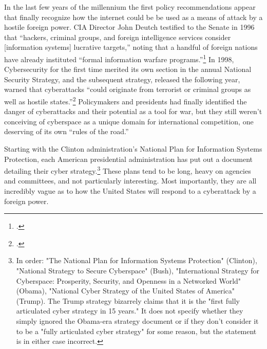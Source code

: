 \documentclass{report}
\begin{document}
\begin{refsegment}
In the last few years of the millennium the first policy recommendations appear that finally recognize how the internet could be be used as a means of attack by a hostile foreign power. CIA Director John Deutch testified to the Senate in 1996 that ``hackers, criminal groups, and foreign intelligence services consider [information systems] lucrative targets,'' noting that a handful of foreign nations have already instituted ``formal information warfare programs.''\footcite{deutch_worldwide_1996} In 1998, Cybersecurity for the first time merited its own section in the annual National Security Strategy, and the subsequent strategy, released the following year, warned that cyberattacks ``could originate from terrorist or criminal groups as well as hostile states.''\footcite[~p.760-761]{boys_clinton_2018} Policymakers and presidents had finally identified the danger of cyberattacks and their potential as a tool for war, but they still weren't conceiving of cyberspace as a unique domain for international competition, one deserving of its own ``rules of the road.''

Starting with the Clinton administration's National Plan for Information Systems Protection, each American presidential administration has put out a document detailing their cyber strategy.\footnote{In order: "The National Plan for Information Systems Protection" (Clinton), "National Strategy to Secure Cyberspace" (Bush), "International Strategy for Cyberspace: Prosperity, Security, and Openness in a Networked World" (Obama), "National Cyber Strategy of the United States of America" (Trump). The Trump strategy bizarrely claims that it is the "first fully articulated cyber strategy in 15 years." It does not specify whether they simply ignored the Obama-era strategy document or if they don't consider it to be a "fully articulated cyber strategy" for some reason, but the statement is in either case incorrect.} These plans tend to be long, heavy on agencies and committees, and not particularly interesting. Most importantly, they are all incredibly vague as to how the United States will respond to a cyberattack by a foreign power.


\end{refsegment}
\end{document}
